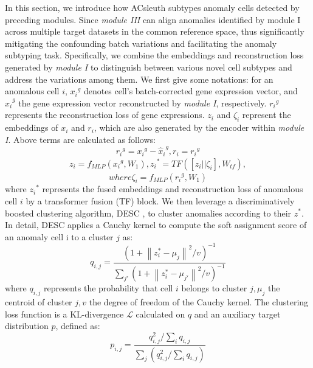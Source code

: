 \documentclass{article}
\begin{document}
In this section, we introduce how ACsleuth subtypes anomaly cells detected by preceding 
modules. Since \textit{module III} can align anomalies identified by module I across multiple 
target datasets in the common reference space, thus significantly mitigating the 
confounding batch variations and facilitating the anomaly subtyping task. Specifically, we 
combine the embeddings and reconstruction loss generated by \textit{module I} to distinguish 
between various novel cell subtypes and address the variations among them. We first give 
some notations: for an anomalous cell $i$, ${x_i}^g$ denotes 
cell’s batch-corrected gene expression vector, and 
${\widehat{x}_i}^g$ the gene expression vector reconstructed by 
\textit{module I}, respectively. ${r_i}^g$ represents the reconstruction 
loss of gene expressions. $z_i$ and $\zeta_i$ represent the embeddings of 
$x_i$ and $r_i$, which are also generated by the 
encoder within \textit{module I}. Above terms are calculated as follows:
\begin{equation}
{r_i}^g = {x_i}^g-{{\widehat{x}}_i}^g, r_i = {r_i}^g
\end{equation}
\begin{equation}
    \begin{split}
        z_i = f_{\textit{MLP}}({x_i}^g,W_1),{z_i}^\ast = TF([z_i||\zeta_i],W_{tf}), 
    \end{split}
\end{equation}
\[
   where \zeta_i = f_{\textit{MLP}}({r_i}^g,W_1)    
\]
where ${z_i}^\ast$ represents the fused embeddings and reconstruction 
loss of anomalous cell $i$ by a transformer fusion (TF) block. We then leverage a 
discriminatively boosted clustering algorithm, DESC \cite{DESC}, to cluster 
anomalies according to their  $z^\ast$. In detail, DESC applies a Cauchy kernel 
to compute the soft assignment score of an anomaly cell i to a cluster $j$ as:
\begin{equation}
    q_{i,j} = \frac{{{(1 + \left\| z_i^\ast - \mu_j \right\|^2 / v)}}^{-1}}{{\sum_{j'} \left(1 + \left\| z_i^\ast - \mu_{j'} \right\|^2 / v\right)^{-1}}}
\end{equation}
where $q_{i,j}$ represents the probability that cell $i$ belongs to cluster $j
, \mu_j$ the centroid of cluster $j, v$ the degree of freedom of the Cauchy kernel. 
The clustering loss function is a KL-divergence $\mathcal{L}$ calculated on $q$ and an 
auxiliary target distribution $p$, defined as:
\begin{equation}
p_{i,j}=\frac{q_{i,j}^2/\sum_{i} q_{i,j}}{\sum_{j}\left(q_{i,j}^2/\sum_{i} q_{i,j}\right)} 
\end{equation}
\end{document}
